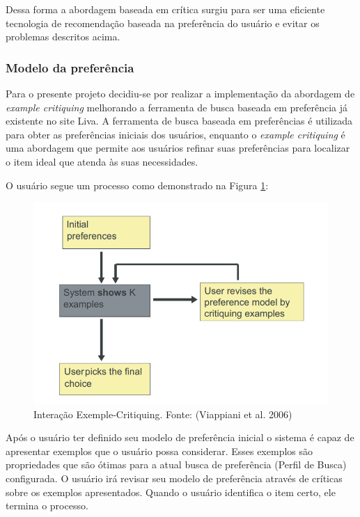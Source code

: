 Dessa forma a abordagem baseada em crítica surgiu para ser uma eficiente tecnologia de recomendação baseada na preferência do usuário e evitar os problemas descritos acima.

\subsubsection{Modelo da preferência}

Para o presente projeto decidiu-se por realizar a implementação da abordagem de \textit{example critiquing} melhorando a ferramenta de busca baseada em preferência já existente no site Liva. A ferramenta de busca baseada em preferências é utilizada para obter as preferências iniciais dos usuários, enquanto o \textit{example critiquing} é uma abordagem que permite aos usuários refinar suas preferências para localizar o item ideal que atenda às suas necessidades.

O usuário segue um processo como demonstrado na Figura \ref{fig:exemple-critiquing}:

\begin{figure}[H]
    \centering
    \includegraphics[scale=0.7]{figuras/proposta/exemple-critiquing.png}
    \caption[Interação Exemple-Critiquing]{Interação Exemple-Critiquing. Fonte: (Viappiani et al. 2006)}
    \label{fig:exemple-critiquing}
\end{figure}

Após o usuário ter definido seu modelo de preferência inicial o sistema é capaz de apresentar exemplos que o usuário possa considerar. Esses exemplos são propriedades que são ótimas para a atual busca de preferência (Perfil de Busca) configurada. O usuário irá revisar seu modelo de preferência através de críticas sobre os exemplos apresentados. Quando o usuário identifica o item certo, ele termina o processo.

